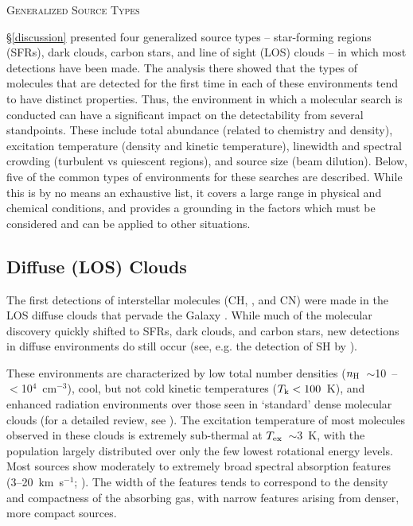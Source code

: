 \documentclass[twocolumn]{aastex631}
\begin{document}
\begin{center}
\textsc{Generalized Source Types}
\end{center}

\S\ref{discussion} presented four generalized source types -- star-forming regions (SFRs), dark clouds, carbon stars, and line of sight (LOS) clouds -- in which most detections have been made.  The analysis there showed that the types of molecules that are detected for the first time in each of these environments tend to have distinct properties.  Thus, the environment in which a molecular search is conducted can have a significant impact on the detectability from several standpoints.  These include total abundance (related to chemistry and density), excitation temperature (density and kinetic temperature), linewidth and spectral crowding (turbulent vs quiescent regions), and source size (beam dilution).  Below, five of the common types of environments for these searches are described.  While this is by no means an exhaustive list, it covers a large range in physical and chemical conditions, and provides a grounding in the factors which must be considered and can be applied to other situations.

\subsection{Diffuse (LOS) Clouds}

The first detections of interstellar molecules (CH, , and CN) were made in the LOS diffuse clouds that pervade the Galaxy \citep{Swings:1937dl,McKellar:1940io,Douglas:1941uc}.  While much of the molecular discovery quickly shifted to SFRs, dark clouds, and carbon stars, new detections in diffuse environments do still occur (see, e.g. the detection of SH by \citealt{Neufeld:2012gz}).

These environments are characterized by low total number densities ($n_{\rm{H}}$~$\sim$10~--~$<$10$^4$~cm$^{-3}$), cool, but not cold kinetic temperatures ($T_{\rm{k}}<100$~K), and enhanced radiation environments over those seen in `standard' dense molecular clouds (for a detailed review, see \citealt{Snow:2006dp}).   The excitation temperature of most molecules observed in these clouds is extremely sub-thermal at $T_{\rm{ex}}$~$\sim$3~K, with the population largely distributed over only the few lowest rotational energy levels. Most sources show moderately to extremely broad spectral absorption features (3--20~km~s$^{-1}$; \citealt{Corby:2018nd}).  The width of the features tends to correspond to the density and compactness of the absorbing gas, with narrow features arising from denser, more compact sources.
\end{document}
